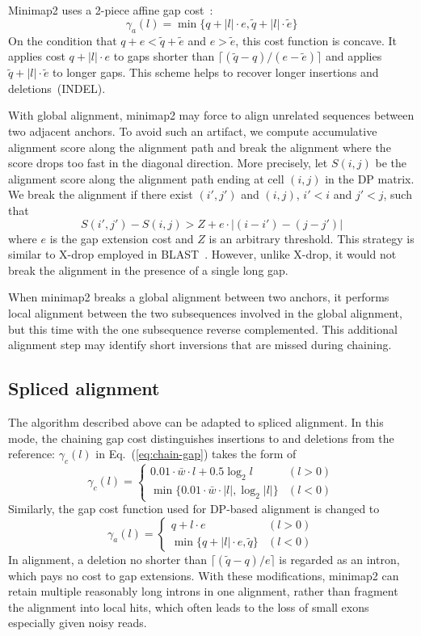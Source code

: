 \documentclass{bioinfo}
\begin{document}
\begin{methods}
Minimap2 uses a 2-piece affine gap cost~\citep{Gotoh:1990aa}:
\begin{equation}\label{eq:2-piece}
\gamma_a(l)=\min\{q+|l|\cdot e,\tilde{q}+|l|\cdot\tilde{e}\}
\end{equation}
On the condition that $q+e<\tilde{q}+\tilde{e}$ and $e>\tilde{e}$, this
cost function is concave. It applies cost $q+|l|\cdot e$ to gaps shorter than
$\lceil(\tilde{q}-q)/(e-\tilde{e})\rceil$ and applies
$\tilde{q}+|l|\cdot\tilde{e}$ to longer gaps. This scheme helps to recover
longer insertions and deletions~(INDEL).

With global alignment, minimap2 may force to align unrelated sequences between
two adjacent anchors. To avoid such an artifact, we compute accumulative
alignment score along the alignment path and break the alignment where the
score drops too fast in the diagonal direction. More precisely, let $S(i,j)$ be
the alignment score along the alignment path ending at cell $(i,j)$ in the DP
matrix. We break the alignment if there exist $(i',j')$ and $(i,j)$, $i'<i$ and
$j'<j$, such that
\[
S(i',j')-S(i,j)>Z+e\cdot|(i-i')-(j-j')|
\]
where $e$ is the gap extension cost and $Z$ is an arbitrary threshold.
This strategy is similar to X-drop employed in BLAST~\citep{Altschul:1997vn}.
However, unlike X-drop, it would not break the alignment in the presence of a
single long gap.

When minimap2 breaks a global alignment between two anchors, it performs local
alignment between the two subsequences involved in the global alignment, but
this time with the one subsequence reverse complemented. This additional
alignment step may identify short inversions that are missed during chaining.

\subsection{Spliced alignment}

The algorithm described above can be adapted to spliced alignment. In this
mode, the chaining gap cost distinguishes insertions to and deletions from the
reference: $\gamma_c(l)$ in Eq.~(\ref{eq:chain-gap}) takes the form of
\[
\gamma_c(l)=\left\{\begin{array}{ll}
0.01\cdot\bar{w}\cdot l+0.5\log_2 l & (l>0) \\
\min\{0.01\cdot\bar{w}\cdot|l|,\log_2|l|\} & (l<0)
\end{array}\right.
\]
Similarly, the gap cost function used for DP-based alignment is changed to
\[
\gamma_a(l)=\left\{\begin{array}{ll}
q+l\cdot e & (l>0) \\
\min\{q+|l|\cdot e,\tilde{q}\} & (l<0)
\end{array}\right.
\]
In alignment, a deletion no shorter than $\lceil(\tilde{q}-q)/e\rceil$ is
regarded as an intron, which pays no cost to gap extensions. With these
modifications, minimap2 can retain multiple reasonably long introns in one
alignment, rather than fragment the alignment into local hits, which often
leads to the loss of small exons especially given noisy reads.

\end{methods}
\end{document}
